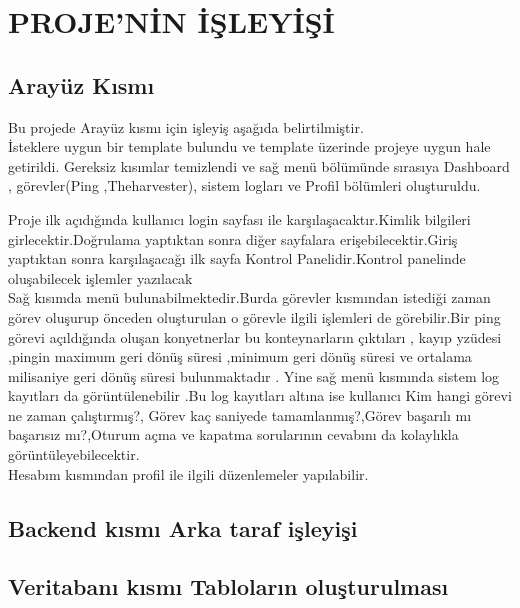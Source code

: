 \section{PROJE'NİN İŞLEYİŞİ}
\subsection{Arayüz Kısmı }
Bu projede  Arayüz  kısmı için işleyiş aşağıda belirtilmiştir.  \\
İsteklere uygun bir template bulundu ve template üzerinde projeye uygun hale getirildi. Gereksiz kısımlar temizlendi ve sağ menü bölümünde sırasıya Dashboard , görevler(Ping ,Theharvester), sistem logları ve Profil   bölümleri oluşturuldu. 

Proje ilk açıdığında kullanıcı login sayfası ile karşılaşacaktır.Kimlik bilgileri girlecektir.Doğrulama yaptıktan sonra diğer sayfalara erişebilecektir.Giriş yaptıktan sonra karşılaşacağı ilk sayfa  Kontrol Panelidir.Kontrol panelinde oluşabilecek işlemler yazılacak\\
Sağ kısımda menü bulunabilmektedir.Burda görevler kısmından istediği zaman görev oluşurup önceden oluşturulan o görevle ilgili işlemleri  de görebilir.Bir ping görevi  açıldığında oluşan konyetnerlar bu  konteynarların çıktıları , kayıp yzüdesi ,pingin maximum  geri dönüş süresi ,minimum geri dönüş süresi ve  ortalama milisaniye geri dönüş süresi bulunmaktadır .%
 Yine sağ menü kısmında sistem log kayıtları da görüntülenebilir .Bu log kayıtları altına ise kullanıcı Kim hangi görevi ne zaman çalıştırmış?, Görev kaç saniyede tamamlanmış?,Görev başarılı mı başarısız mı?,Oturum açma ve kapatma sorularının cevabını da kolaylıkla görüntüleyebilecektir.\\
Hesabım kısmından profil ile  ilgili düzenlemeler yapılabilir.

\subsection{Backend kısmı Arka taraf işleyişi}

 \subsection {Veritabanı kısmı Tabloların oluşturulması }
 